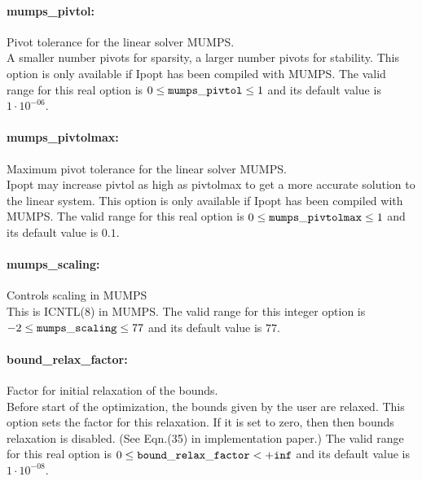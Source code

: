 \paragraph{mumps\_pivtol:}\label{sec:mumps_pivtol} Pivot tolerance for the linear solver MUMPS. $\;$ \\
 A smaller number pivots for sparsity, a larger
number pivots for stability.  This option is only
available if Ipopt has been compiled with MUMPS. The valid range for this real option is 
$0 \le {\tt mumps\_pivtol } \le 1$
and its default value is $1 \cdot 10^{-06}$.


\paragraph{mumps\_pivtolmax:}\label{sec:mumps_pivtolmax} Maximum pivot tolerance for the linear solver MUMPS. $\;$ \\
 Ipopt may increase pivtol as high as pivtolmax to
get a more accurate solution to the linear
system.  This option is only available if Ipopt
has been compiled with MUMPS. The valid range for this real option is 
$0 \le {\tt mumps\_pivtolmax } \le 1$
and its default value is $0.1$.


\paragraph{mumps\_scaling:}\label{sec:mumps_scaling} Controls scaling in MUMPS $\;$ \\
 This is ICNTL(8) in MUMPS. The valid range for this integer option is
$-2 \le {\tt mumps\_scaling } \le 77$
and its default value is $77$.


\paragraph{bound\_relax\_factor:}\label{sec:bound_relax_factor} Factor for initial relaxation of the bounds. $\;$ \\
 Before start of the optimization, the bounds
given by the user are relaxed.  This option sets
the factor for this relaxation.  If it is set to
zero, then then bounds relaxation is disabled.
(See Eqn.(35) in implementation paper.) The valid range for this real option is 
$0 \le {\tt bound\_relax\_factor } <  {\tt +inf}$
and its default value is $1 \cdot 10^{-08}$.


